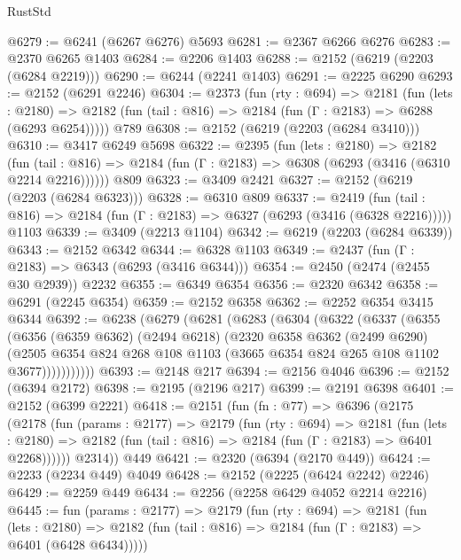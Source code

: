 \begin{lexlean}{RustStd}
\begin{coremodule}
@6279 := @6241 (@6267 @6276) @5693
@6281 := @2367 @6266 @6276
@6283 := @2370 @6265 @1403
@6284 := @2206 @1403
@6288 := @2152 (@6219 (@2203 (@6284 @2219)))
@6290 := @6244 (@2241 @1403)
@6291 := @2225 @6290
@6293 := @2152 (@6291 @2246)
@6304 := @2373
    (fun (rty : @694) =>
    @2181
      (fun (lets : @2180) =>
      @2182 (fun (tail : @816) => @2184 (fun (Γ : @2183) => @6288 (@6293 @6254)))))
    @789
@6308 := @2152 (@6219 (@2203 (@6284 @3410)))
@6310 := @3417 @6249 @5698
@6322 := @2395
    (fun (lets : @2180) =>
    @2182
      (fun (tail : @816) => @2184 (fun (Γ : @2183) => @6308 (@6293 (@3416 (@6310 @2214 @2216))))))
    @809
@6323 := @3409 @2421
@6327 := @2152 (@6219 (@2203 (@6284 @6323)))
@6328 := @6310 @809
@6337 := @2419
    (fun (tail : @816) => @2184 (fun (Γ : @2183) => @6327 (@6293 (@3416 (@6328 @2216)))))
    @1103
@6339 := @3409 (@2213 @1104)
@6342 := @6219 (@2203 (@6284 @6339))
@6343 := @2152 @6342
@6344 := @6328 @1103
@6349 := @2437 (fun (Γ : @2183) => @6343 (@6293 (@3416 @6344)))
@6354 := @2450 (@2474 (@2455 @30 @2939)) @2232
@6355 := @6349 @6354
@6356 := @2320 @6342
@6358 := @6291 (@2245 @6354)
@6359 := @2152 @6358
@6362 := @2252 @6354 @3415 @6344
@6392 := @6238
    (@6279
      (@6281
        (@6283
          (@6304
            (@6322
              (@6337
                (@6355
                  (@6356
                    (@6359 @6362)
                    (@2494 @6218)
                    (@2320
                      @6358
                      @6362
                      (@2499 @6290)
                      (@2505
                        @6354
                        @824
                        @268
                        @108
                        @1103
                        (@3665 @6354 @824 @265 @108 @1102 @3677)))))))))))
@6393 := @2148 @217
@6394 := @2156 @4046
@6396 := @2152 (@6394 @2172)
@6398 := @2195 (@2196 @217)
@6399 := @2191 @6398
@6401 := @2152 (@6399 @2221)
@6418 := @2151
    (fun (fn : @77) =>
    @6396
      (@2175
        (@2178
          (fun (params : @2177) =>
          @2179
            (fun (rty : @694) =>
            @2181
              (fun (lets : @2180) =>
              @2182 (fun (tail : @816) => @2184 (fun (Γ : @2183) => @6401 @2268))))))
        @2314))
    @449
@6421 := @2320 (@6394 (@2170 @449))
@6424 := @2233 (@2234 @449) @4049
@6428 := @2152 (@2225 (@6424 @2242) @2246)
@6429 := @2259 @449
@6434 := @2256 (@2258 @6429 @4052 @2214 @2216)
@6445 := fun (params : @2177) =>
  @2179
    (fun (rty : @694) =>
    @2181
      (fun (lets : @2180) =>
      @2182 (fun (tail : @816) => @2184 (fun (Γ : @2183) => @6401 (@6428 @6434)))))

\end{coremodule}
\end{lexlean}
